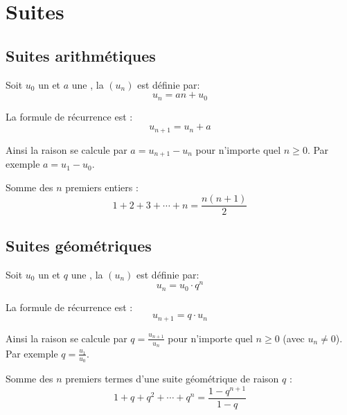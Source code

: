 \documentclass[10pt,class=article,crop=false]{standalone}
\begin{document}
\section{Suites}

\begin{multicols}{2}
	
\subsection{Suites arithmétiques}

Soit $u_0$ un  et $a$ une , la  $(u_n)$ est définie par:
$$u_n = a n + u_0$$

La formule de récurrence est :
$$u_{n+1} = u_n + a$$

Ainsi la raison se calcule par $a = u_{n+1} - u_n$ pour n'importe quel $n \ge 0$. 
Par exemple $a = u_1 - u_0$.

Somme des $n$ premiers entiers :
$$1+2+3+\cdots+n = \frac{n(n+1)}{2}$$


\subsection{Suites géométriques}

Soit $u_0$ un  et $q$ une , la  $(u_n)$ est définie par:
$$u_n = u_0 \cdot q^n$$

La formule de récurrence est :
$$u_{n+1} = q \cdot u_n$$

Ainsi la raison se calcule par $q = \frac{u_{n+1}}{u_n}$ pour n'importe quel $n \ge 0$ (avec $u_n \neq 0$).
Par exemple $q = \frac{u_1}{u_0}$.

Somme des $n$ premiers termes d'une suite géométrique  de raison $q$ :
$$1+q+q^2+\cdots+q^n = \frac{1-q^{n+1}}{1-q}$$


\end{multicols}
\end{document}

